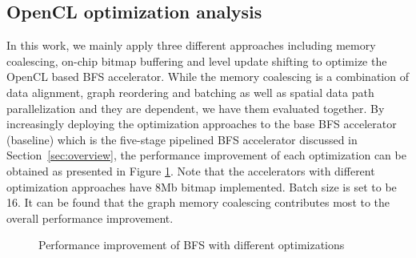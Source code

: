 \subsection{OpenCL optimization analysis}
In this work, we mainly apply three different approaches including 
memory coalescing, on-chip bitmap buffering and level update shifting 
to optimize the OpenCL based BFS accelerator. While the memory coalescing is 
a combination of data alignment, graph reordering and batching as well as 
spatial data path parallelization and they are dependent, 
we have them evaluated together. By increasingly deploying the optimization 
approaches to the base BFS accelerator (baseline) which is the five-stage pipelined BFS 
accelerator discussed in Section~\ref{sec:overview}, the performance improvement of each 
optimization can be obtained as presented in Figure \ref{fig:opt-analysis}. 
Note that the accelerators with different optimization approaches have 8Mb 
bitmap implemented. Batch size is set to be 16. It can be found that the 
graph memory coalescing contributes most to the overall performance improvement. 

 \begin{figure}
	\caption{Performance improvement of BFS with different optimizations}
\label{fig:opt-analysis}
\vspace{-1em}
\end{figure}



